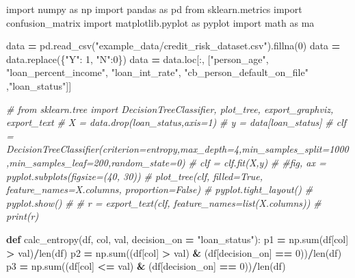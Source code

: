 \documentclass[
]{book}
\newenvironment{Shaded}{\begin{snugshade}}{\end{snugshade}}
\newcommand{\BuiltInTok}[1]{#1}
\newcommand{\CommentTok}[1]{\textcolor[rgb]{0.56,0.35,0.01}{\textit{#1}}}
\newcommand{\DecValTok}[1]{\textcolor[rgb]{0.00,0.00,0.81}{#1}}
\newcommand{\ImportTok}[1]{#1}
\newcommand{\KeywordTok}[1]{\textcolor[rgb]{0.13,0.29,0.53}{\textbf{#1}}}
\newcommand{\NormalTok}[1]{#1}
\newcommand{\OperatorTok}[1]{\textcolor[rgb]{0.81,0.36,0.00}{\textbf{#1}}}
\newcommand{\StringTok}[1]{\textcolor[rgb]{0.31,0.60,0.02}{#1}}
\begin{document}
\begin{Shaded}
\begin{Highlighting}[]
\ImportTok{import}\NormalTok{ numpy }\ImportTok{as}\NormalTok{ np}
\ImportTok{import}\NormalTok{ pandas }\ImportTok{as}\NormalTok{ pd}
\ImportTok{from}\NormalTok{ sklearn.metrics }\ImportTok{import}\NormalTok{ confusion\_matrix}
\ImportTok{import}\NormalTok{ matplotlib.pyplot }\ImportTok{as}\NormalTok{ pyplot}
\ImportTok{import}\NormalTok{ math }\ImportTok{as}\NormalTok{ ma}


\NormalTok{data }\OperatorTok{=}\NormalTok{ pd.read\_csv(}\StringTok{"example\_data/credit\_risk\_dataset.csv"}\NormalTok{).fillna(}\DecValTok{0}\NormalTok{)}
\NormalTok{data }\OperatorTok{=}\NormalTok{ data.replace(\{}\StringTok{"Y"}\NormalTok{: }\DecValTok{1}\NormalTok{, }\StringTok{"N"}\NormalTok{:}\DecValTok{0}\NormalTok{\})}
\NormalTok{data }\OperatorTok{=}\NormalTok{ data.loc[:, [}\StringTok{"person\_age"}\NormalTok{, }\StringTok{"loan\_percent\_income"}\NormalTok{, }\StringTok{"loan\_int\_rate"}\NormalTok{, }\StringTok{"cb\_person\_default\_on\_file"}\NormalTok{ ,}\StringTok{"loan\_status"}\NormalTok{]]}




\CommentTok{\# from sklearn.tree import DecisionTreeClassifier, plot\_tree, export\_graphviz, export\_text}
\CommentTok{\# X = data.drop(\textquotesingle{}loan\_status\textquotesingle{},axis=1)}
\CommentTok{\# y = data[\textquotesingle{}loan\_status\textquotesingle{}]}
\CommentTok{\# clf = DecisionTreeClassifier(criterion=\textquotesingle{}entropy\textquotesingle{},max\_depth=4,min\_samples\_split=1000,min\_samples\_leaf=200,random\_state=0)}
\CommentTok{\# clf = clf.fit(X,y)}
\CommentTok{\# \#fig, ax = pyplot.subplots(figsize=(40, 30))}
\CommentTok{\# plot\_tree(clf, filled=True, feature\_names=X.columns, proportion=False)}
\CommentTok{\# pyplot.tight\_layout()}
\CommentTok{\# pyplot.show()}
\CommentTok{\# }
\CommentTok{\# r = export\_text(clf, feature\_names=list(X.columns))}
\CommentTok{\# print(r)}








\KeywordTok{def}\NormalTok{ calc\_entropy(df, col, val, decision\_on }\OperatorTok{=} \StringTok{"loan\_status"}\NormalTok{):}
\NormalTok{  p1 }\OperatorTok{=}\NormalTok{ np.}\BuiltInTok{sum}\NormalTok{(df[col] }\OperatorTok{\textgreater{}}\NormalTok{ val)}\OperatorTok{/}\BuiltInTok{len}\NormalTok{(df)}
\NormalTok{  p2 }\OperatorTok{=}\NormalTok{ np.}\BuiltInTok{sum}\NormalTok{((df[col] }\OperatorTok{\textgreater{}}\NormalTok{ val) }\OperatorTok{\&}\NormalTok{ (df[decision\_on] }\OperatorTok{==} \DecValTok{0}\NormalTok{))}\OperatorTok{/}\BuiltInTok{len}\NormalTok{(df)}
\NormalTok{  p3 }\OperatorTok{=}\NormalTok{ np.}\BuiltInTok{sum}\NormalTok{((df[col] }\OperatorTok{\textless{}=}\NormalTok{ val) }\OperatorTok{\&}\NormalTok{ (df[decision\_on] }\OperatorTok{==} \DecValTok{0}\NormalTok{))}\OperatorTok{/}\BuiltInTok{len}\NormalTok{(df)}
  

\end{Highlighting}
\end{Shaded}
\end{document}
